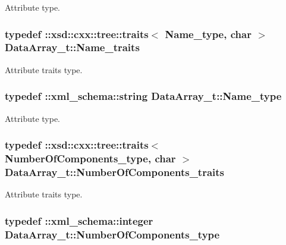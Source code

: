 Attribute type. 

\hypertarget{classDataArray__t_a46d0b4cf44ee9122e4cbb3bd3abe6663}{
\subsubsection[{Name\+\_\+traits}]{\setlength{\rightskip}{0pt plus 5cm}typedef \+::xsd\+::cxx\+::tree\+::traits$<$ {\bf Name\+\_\+type}, char $>$ {\bf Data\+Array\+\_\+t\+::\+Name\+\_\+traits}}}\label{classDataArray__t_a46d0b4cf44ee9122e4cbb3bd3abe6663}


Attribute traits type. 

\hypertarget{classDataArray__t_afc6836923916c2489f91caea78ec4ad6}{
\subsubsection[{Name\+\_\+type}]{\setlength{\rightskip}{0pt plus 5cm}typedef \+::{\bf xml\+\_\+schema\+::string} {\bf Data\+Array\+\_\+t\+::\+Name\+\_\+type}}}\label{classDataArray__t_afc6836923916c2489f91caea78ec4ad6}


Attribute type. 

\hypertarget{classDataArray__t_a1112148f87db2c0ba05323377d9f0427}{
\subsubsection[{Number\+Of\+Components\+\_\+traits}]{\setlength{\rightskip}{0pt plus 5cm}typedef \+::xsd\+::cxx\+::tree\+::traits$<$ {\bf Number\+Of\+Components\+\_\+type}, char $>$ {\bf Data\+Array\+\_\+t\+::\+Number\+Of\+Components\+\_\+traits}}}\label{classDataArray__t_a1112148f87db2c0ba05323377d9f0427}


Attribute traits type. 

\hypertarget{classDataArray__t_aac602cec132f6e771f7fa3be1d19c16f}{
\subsubsection[{Number\+Of\+Components\+\_\+type}]{\setlength{\rightskip}{0pt plus 5cm}typedef \+::{\bf xml\+\_\+schema\+::integer} {\bf Data\+Array\+\_\+t\+::\+Number\+Of\+Components\+\_\+type}}}\label{classDataArray__t_aac602cec132f6e771f7fa3be1d19c16f}


